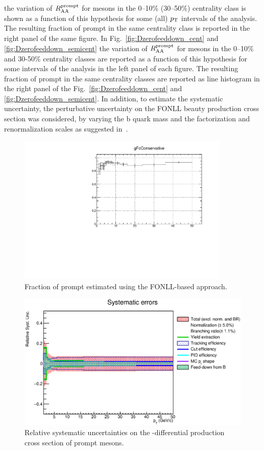 the variation of $R_{\mathrm{AA}}^{\rm prompt}$ for \Dsubs mesons in the 0--10\% (30--50\%) centrality class is shown as a function of
this hypothesis for some (all) $p_{\rm T}$ intervals of the analysis. The resulting fraction of prompt \Dsubs in the same centrality class is reported in the right panel of the same figure.
In Fig.~\ref{fig:Dzerofeeddown_cent} and \ref{fig:Dzerofeeddown_semicent} the variation of $R_{\mathrm{AA}}^{\rm prompt}$ for \Dzero mesons in the 0--10\% and 30-50\% centrality classes are reported as a function of this hypothesis for some \pt intervals of the analysis in the left panel of each figure. The resulting fraction of prompt \Dzero in the same centrality classes are reported as line histogram in the right panel of the Fig.~\ref{fig:Dzerofeeddown_cent} and \ref{fig:Dzerofeeddown_semicent}.
In addition, to estimate the systematic uncertainty, the perturbative uncertainty on the FONLL beauty production cross section was considered, by varying the b quark mass and the factorization and renormalization scales as suggested in~\cite{Acharya:2019mgn}. 



\begin{figure}[tb]
\begin{center}
 \includegraphics[width=0.9\textwidth]{figures/Dstar/pp13TeV/feed-down-syst-Dstar.pdf}
\caption{Fraction of prompt \Dstar estimated using the FONLL-based approach.}
\label{fig:Dstarfeeddown_cent}
\end{center}
\end{figure}




\begin{figure}[tb]
\begin{center}
 \includegraphics[width=1\textwidth]{figures/Dstar/pp13TeV/RelativeSystematics.eps}
\caption{Relative systematic uncertainties on the \pt -differential production cross
section of prompt \Dstar mesons.}
\label{fig:DstarSystSum}
\end{center}
\end{figure}
